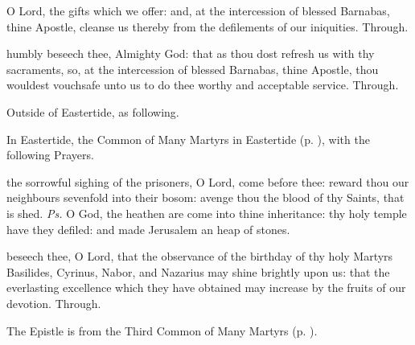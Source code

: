 
\secret
{} O Lord, the gifts which we offer: and, at the intercession of blessed Barnabas, thine Apostle, cleanse us thereby from the defilements of our iniquities. Through.


\postcommunion
{} humbly beseech thee, Almighty God: that as thou dost refresh us with thy sacraments, so, at the intercession of blessed Barnabas, thine Apostle, thou wouldest vouchsafe unto us to do thee worthy and acceptable service. Through.


\clearpage
{}

\begin{rubric}
	Outside of Eastertide, as following.
\end{rubric}

\begin{rubric}
	In Eastertide, the Common of Many Martyrs in Eastertide (p. \pageref{CommonMartyrsEaster}), with the following Prayers.
\end{rubric}

\introit
{} the sorrowful sighing of the prisoners, O Lord, come before thee: reward thou our neighbours sevenfold into their bosom: avenge thou the blood of thy Saints, that is shed. \textit{Ps.} O God, the heathen are come into thine inheritance: thy holy temple have they defiled: and made Jerusalem an heap of stones.

\collect
{} beseech thee, O Lord, that the observance of the birthday of thy holy Martyrs Basilides, Cyrinus, Nabor, and Nazarius may shine brightly upon us: that the everlasting excellence which they have obtained may increase by the fruits of our devotion. Through.

\begin{rubric}
	The Epistle is from the Third Common of Many Martyrs (p. \pageref{Hebrews1032}).
\end{rubric}


